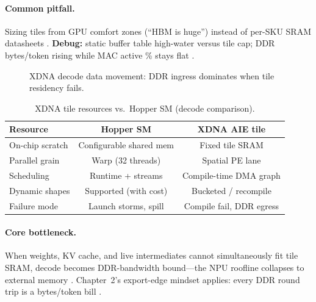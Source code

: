 \paragraph{Common pitfall.}
Sizing tiles from GPU comfort zones (``HBM is huge'') instead of per-SKU SRAM datasheets \citep{amd2024xdna}.
\textbf{Debug:} static buffer table high-water versus tile cap; DDR bytes/token rising while MAC active \% stays flat \citep{patel2025llminference}.

\begin{figure}[t]
\centering
{}
\caption{XDNA decode data movement: DDR ingress dominates when tile residency fails.}
\label{fig:xdna_tiles_pipeline}
\end{figure}

\begin{table}[t]
\centering
\caption{XDNA tile resources vs.\ Hopper SM (decode comparison).}
\label{tab:xdna_tiles}
\begin{tabular}{lcc}
\toprule
\textbf{Resource} & \textbf{Hopper SM} & \textbf{XDNA AIE tile} \\
\midrule
On-chip scratch & Configurable shared mem & Fixed tile SRAM \\
Parallel grain & Warp (32 threads) & Spatial PE lane \\
Scheduling & Runtime + streams & Compile-time DMA graph \\
Dynamic shapes & Supported (with cost) & Bucketed / recompile \\
Failure mode & Launch storms, spill & Compile fail, DDR egress \\
\bottomrule
\end{tabular}
\end{table}

\paragraph{Core bottleneck.}
When weights, KV cache, and live intermediates cannot simultaneously fit tile SRAM, decode becomes DDR-bandwidth bound---the NPU roofline collapses to external memory \citep{memoryfloor2026,dao2022flashattention}.
Chapter~2's export-edge mindset applies: every DDR round trip is a bytes/token bill \citep{chen2020compilerbasedhardw}.

